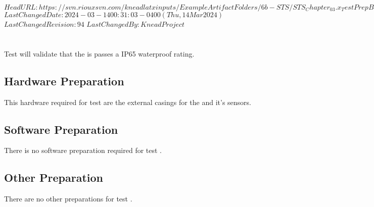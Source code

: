 \svnidlong
{$HeadURL: https://svn.riouxsvn.com/kneadlatxinputs/ExampleArtifactFolders/6b-STS/STS_Chapter_03.x_TestPrepBase.tex $}
{$LastChangedDate: 2024-03-14 00:31:03 -0400 (Thu, 14 Mar 2024) $}
{$LastChangedRevision: 94 $}
{$LastChangedBy: KneadProject $}

\section{\StsTestID}
\label{loc:Prep\StsTestID}
% 

Test  will validate that the \ThisSystem is passes a IP65 waterproof rating.

\subsection{Hardware Preparation}
\label{loc:HardwarePrep\StsTestID}
% 

This hardware required for test  are the external casings for the \ThisSystem and it's sensors.

\subsection{Software Preparation}
\label{loc:SoftwarePrep\StsTestID}
% 

There is no software preparation required for test .

\subsection{Other Preparation}
\label{loc:OtherPrep\StsTestID}
% 

There are no other preparations for test .
